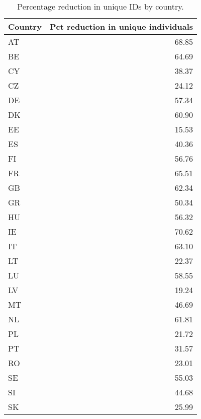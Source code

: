 \begin{table}[ht]
\centering
\begin{tabular}{lr}
  \hline
Country & Pct reduction in unique individuals \\ 
  \hline
AT & 68.85 \\ 
  BE & 64.69 \\ 
  CY & 38.37 \\ 
  CZ & 24.12 \\ 
  DE & 57.34 \\ 
  DK & 60.90 \\ 
  EE & 15.53 \\ 
  ES & 40.36 \\ 
  FI & 56.76 \\ 
  FR & 65.51 \\ 
  GB & 62.34 \\ 
  GR & 50.34 \\ 
  HU & 56.32 \\ 
  IE & 70.62 \\ 
  IT & 63.10 \\ 
  LT & 22.37 \\ 
  LU & 58.55 \\ 
  LV & 19.24 \\ 
  MT & 46.69 \\ 
  NL & 61.81 \\ 
  PL & 21.72 \\ 
  PT & 31.57 \\ 
  RO & 23.01 \\ 
  SE & 55.03 \\ 
  SI & 44.68 \\ 
  SK & 25.99 \\ 
   \hline
\end{tabular}
\caption{Percentage reduction in unique IDs by country.} 
\label{tab:id_pct_reduction}
\end{table}
